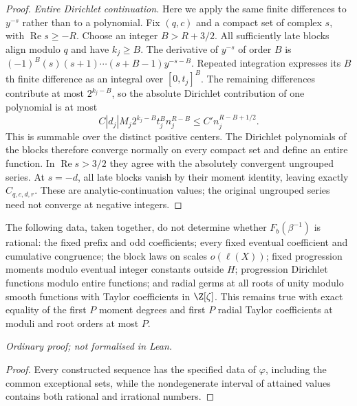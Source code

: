 \begin{proof}
\emph{Entire Dirichlet continuation.} Here we apply the same finite
differences to $y^{-s}$ rather than to a polynomial. Fix $(q,c)$ and a
compact set of complex $s$, with $\operatorname{Re}s\ge-R$. Choose an
integer $B>R+3/2$. All sufficiently late blocks align modulo $q$ and
have $k_j\ge B$. The derivative of $y^{-s}$ of order $B$ is
$(-1)^B(s)(s+1)\cdots(s+B-1)y^{-s-B}$. Repeated integration expresses
its $B$th finite difference as an integral over $[0,t_j]^B$.
The remaining differences contribute at most $2^{k_j-B}$, so the
absolute Dirichlet contribution of one polynomial is at most
\[
 C|d_j|M_j2^{k_j-B}t_j^B n_j^{R-B}
 \le C' n_j^{R-B+1/2}.
\]
This is summable over the distinct positive centers. The Dirichlet polynomials of the blocks therefore converge normally on every compact
set and define an entire function. In $\operatorname{Re}s>3/2$ they
agree with the absolutely convergent ungrouped series. At $s=-d$,
all late blocks vanish by their moment identity, leaving exactly
$C_{q,c,d,r}$. These are analytic-continuation values; the original
ungrouped series need not converge at negative integers.
\end{proof}

\begin{rem}
\label{long249:cor:signed-observations}
The following data, taken together, do not determine whether
$F_b(\beta^{-1})$ is rational: the fixed prefix and odd coefficients;
every fixed eventual coefficient and cumulative congruence; the block
laws on scales $o(\ell(X))$; fixed progression moments modulo eventual
integer constants outside $H$; progression Dirichlet functions modulo
entire functions; and radial germs at all roots of unity modulo smooth
functions with Taylor coefficients in $\Z[\zeta]$. This remains true
with exact equality of the first $P$ moment degrees and first $P$
radial Taylor coefficients at moduli and root orders at most $P$.
\end{rem}
\noindent\emph{Ordinary proof; not formalised in Lean.}


\begin{proof}
Every constructed sequence has the specified data of $\varphi$, including
the common exceptional sets, while the nondegenerate interval of attained
values contains both rational and irrational numbers.
\end{proof}

